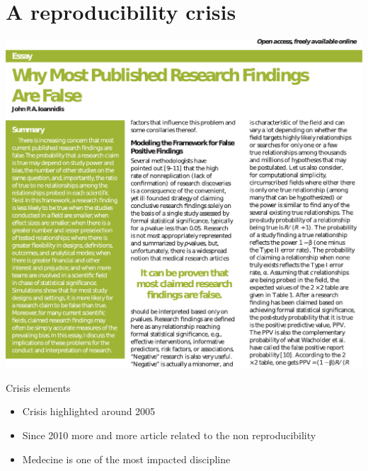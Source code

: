 \section{A reproducibility crisis}
\begin{frame}
\centering\includegraphics[scale=0.4]{images/reproduce_crisis_paper.pdf}
\end{frame}

\begin{frame}
\begin{block}{Crisis elements}
\begin{itemize}
\item Crisis highlighted around 2005
\item Since 2010 more and more article related to the non reproducibility
\item Medecine is one of the most impacted discipline
\end{itemize}
\end{block}
\end{frame}


